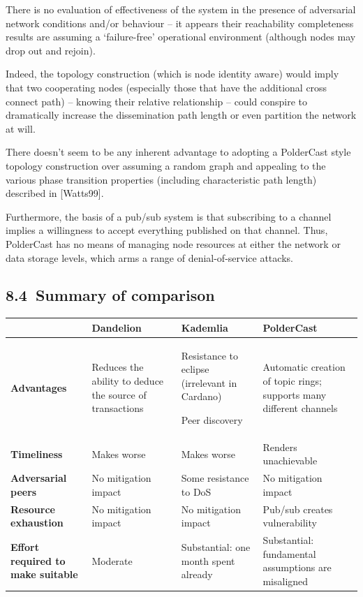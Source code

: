 \documentclass[]{article}
\begin{document}
There is no evaluation of effectiveness of the system in the presence of
adversarial network conditions and/or behaviour -- it appears their
reachability completeness results are assuming a `failure-free'
operational environment (although nodes may drop out and rejoin).

Indeed, the topology construction (which is node identity aware) would
imply that two cooperating nodes (especially those that have the
additional cross connect path) -- knowing their relative relationship --
could conspire to dramatically increase the dissemination path length or
even partition the network at will.

There doesn't seem to be any inherent advantage to adopting a PolderCast
style topology construction over assuming a random graph and appealing
to the various phase transition properties (including characteristic
path length) described in {[}Watts99{]}.

Furthermore, the basis of a pub/sub system is that subscribing to a
channel implies a willingness to accept everything published on that
channel. Thus, PolderCast has no means of managing node resources at
either the network or data storage levels, which arms a range of
denial-of-service attacks.

\hypertarget{summary-of-comparison}{%
\subsection{​8.4​~Summary of comparison}\label{summary-of-comparison}}

\begin{longtable}[]{@{}llll@{}}
\toprule
& \textbf{Dandelion} & \textbf{Kademlia} &
\textbf{PolderCast}\tabularnewline
\midrule
\endhead
\begin{minipage}[t]{0.22\columnwidth}\raggedright
\textbf{Advantages}\strut
\end{minipage} & \begin{minipage}[t]{0.22\columnwidth}\raggedright
Reduces the ability to deduce the source of transactions\strut
\end{minipage} & \begin{minipage}[t]{0.22\columnwidth}\raggedright
Resistance to eclipse (irrelevant in Cardano)

Peer discovery\strut
\end{minipage} & \begin{minipage}[t]{0.22\columnwidth}\raggedright
Automatic creation of topic rings; supports many different
channels\strut
\end{minipage}\tabularnewline
\textbf{Timeliness} & Makes worse & Makes worse & Renders
unachievable\tabularnewline
\textbf{Adversarial peers} & No mitigation impact & Some resistance to
DoS & No mitigation impact\tabularnewline
\textbf{Resource exhaustion} & No mitigation impact & No mitigation
impact & Pub/sub creates vulnerability\tabularnewline
\textbf{Effort required to make suitable} & Moderate & Substantial: one
month spent already & Substantial: fundamental assumptions are
misaligned\tabularnewline
\bottomrule
\end{longtable}
\end{document}
